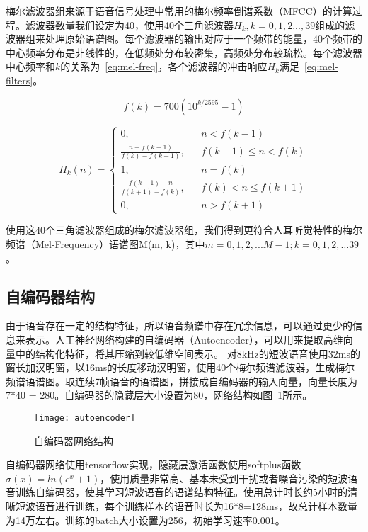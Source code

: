 梅尔滤波器组来源于语音信号处理中常用的梅尔频率倒谱系数（MFCC）的计算过程。滤波器数量我们设定为40，使用40个三角滤波器$H_k, k=0,1,2...,39$组成的滤波器组来处理原始语谱图。每个滤波器的输出对应于一个频带的能量，40个频带的中心频率分布是非线性的，在低频处分布较密集，高频处分布较疏松。每个滤波器中心频率和$k$的关系为~\ref{eq:mel-freq}，各个滤波器的冲击响应$H_k$满足~\ref{eq:mel-filters}。

\begin{equation}\label{eq:mel-freq}
f(k) = 700(10^{k/2595}-1)
\end{equation}

\begin{equation}\label{eq:mel-filters}
H_k(n) = \left\{
    \begin{array}{rcl}
    0, && {n<f(k-1)} \\
    \frac{n-f(k-1)}{f(k)-f(k-1)}, && {f(k-1)\leq n < f(k)} \\
    1, && {n=f(k)} \\
    \frac{f(k+1)-n}{f(k+1)-f(k)}, && {f(k) < n \leq f(k+1)} \\
    0, && {n > f(k+1)}
    \end{array} \right.
\end{equation}

使用这40个三角滤波器组成的梅尔滤波器组，我们得到更符合人耳听觉特性的梅尔频谱（Mel-Frequency）语谱图M(m, k)，其中$m=0,1,2,...M-1; k=0,1,2,…39$。

\subsection{自编码器结构}

由于语音存在一定的结构特征，所以语音频谱中存在冗余信息，可以通过更少的信息来表示。人工神经网络构建的自编码器（Autoencoder），可以用来提取高维向量中的结构化特征，将其压缩到较低维空间表示。
对8kHz的短波语音使用32ms的窗长加汉明窗，以16ms的长度移动汉明窗，使用40个梅尔频谱滤波器，生成梅尔频谱语谱图。取连续7帧语音的语谱图，拼接成自编码器的输入向量，向量长度为7*40 = 280。自编码器的隐藏层大小设置为80，网络结构如图~\ref{fig:autoencoder}所示。

\begin{figure}
\centering
\texttt{[image: autoencoder]}
\caption{自编码器网络结构\label{fig:autoencoder}}
\end{figure}

自编码器网络使用tensorflow\cite{abadi2016tensorflow}实现，隐藏层激活函数使用softplus函数$\sigma(x)=ln⁡(e^x+1)$，使用质量非常高、基本未受到干扰或者噪音污染的短波语音训练自编码器，使其学习短波语音的语谱结构特征。使用总计时长约5小时的清晰短波语音进行训练，每个训练样本的语音时长为16*8=128ms，故总计样本数量为14万左右。训练的batch大小设置为256，初始学习速率0.001。

